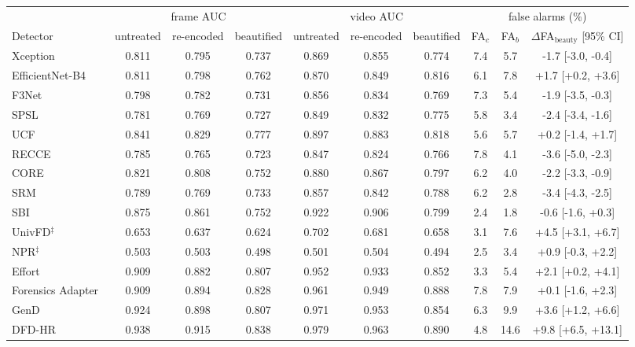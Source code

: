 \begin{tabular}{@{}l ccc ccc ccc@{}}
\toprule
 & \multicolumn{3}{c}{frame AUC} & \multicolumn{3}{c}{video AUC} & \multicolumn{3}{c}{false alarms (\%)} \\
\cmidrule(lr){2-4}\cmidrule(lr){5-7}\cmidrule(lr){8-10}
Detector & untreated & re-encoded & beautified & untreated & re-encoded & beautified & FA$_c$ & FA$_b$ & $\Delta$FA$_\text{beauty}$ [95\% CI] \\
\midrule
Xception~\cite{xception} & 0.811 & 0.795 & 0.737 & 0.869 & 0.855 & 0.774 & 7.4 & 5.7 & -1.7 [-3.0, -0.4] \\
EfficientNet-B4~\cite{efficientnet} & 0.811 & 0.798 & 0.762 & 0.870 & 0.849 & 0.816 & 6.1 & 7.8 & +1.7 [+0.2, +3.6] \\
F3Net~\cite{f3net} & 0.798 & 0.782 & 0.731 & 0.856 & 0.834 & 0.769 & 7.3 & 5.4 & -1.9 [-3.5, -0.3] \\
SPSL~\cite{spsl} & 0.781 & 0.769 & 0.727 & 0.849 & 0.832 & 0.775 & 5.8 & 3.4 & -2.4 [-3.4, -1.6] \\
UCF~\cite{ucf} & 0.841 & 0.829 & 0.777 & 0.897 & 0.883 & 0.818 & 5.6 & 5.7 & +0.2 [-1.4, +1.7] \\
RECCE~\cite{recce} & 0.785 & 0.765 & 0.723 & 0.847 & 0.824 & 0.766 & 7.8 & 4.1 & -3.6 [-5.0, -2.3] \\
CORE~\cite{core} & 0.821 & 0.808 & 0.752 & 0.880 & 0.867 & 0.797 & 6.2 & 4.0 & -2.2 [-3.3, -0.9] \\
SRM~\cite{srm} & 0.789 & 0.769 & 0.733 & 0.857 & 0.842 & 0.788 & 6.2 & 2.8 & -3.4 [-4.3, -2.5] \\
SBI~\cite{sbi} & 0.875 & 0.861 & 0.752 & 0.922 & 0.906 & 0.799 & 2.4 & 1.8 & -0.6 [-1.6, +0.3] \\
UnivFD$^\ddagger$~\cite{univfd} & 0.653 & 0.637 & 0.624 & 0.702 & 0.681 & 0.658 & 3.1 & 7.6 & +4.5 [+3.1, +6.7] \\
NPR$^\ddagger$~\cite{npr} & 0.503 & 0.503 & 0.498 & 0.501 & 0.504 & 0.494 & 2.5 & 3.4 & +0.9 [-0.3, +2.2] \\
Effort~\cite{effort} & 0.909 & 0.882 & 0.807 & 0.952 & 0.933 & 0.852 & 3.3 & 5.4 & +2.1 [+0.2, +4.1] \\
Forensics Adapter~\cite{forensicsadapter} & 0.909 & 0.894 & 0.828 & 0.961 & 0.949 & 0.888 & 7.8 & 7.9 & +0.1 [-1.6, +2.3] \\
GenD~\cite{gend2026} & 0.924 & 0.898 & 0.807 & 0.971 & 0.953 & 0.854 & 6.3 & 9.9 & +3.6 [+1.2, +6.6] \\
DFD-HR~\cite{dfdhr2026} & 0.938 & 0.915 & 0.838 & 0.979 & 0.963 & 0.890 & 4.8 & 14.6 & +9.8 [+6.5, +13.1] \\

\end{tabular}
